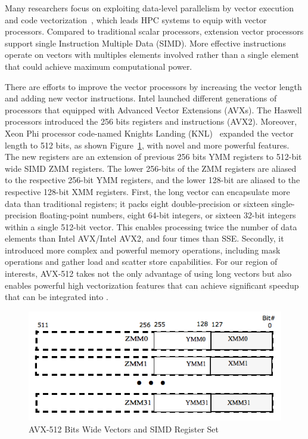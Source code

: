 \documentclass[conference]{IEEEtran}
\begin{document}
%
Many researchers focus on exploiting data-level parallelism by vector execution and code vectorization~\cite{Vectorizing-Compilers, VectorArchitectures}, which leads HPC
systems to equip with vector processors.
%
Compared to traditional scalar processors, extension vector processors support single Instruction Multiple Data (SIMD). More effective instructions operate on vectors with multiples elements involved rather than a single element that could achieve maximum computational power.
%

There are efforts to improve the vector processors by increasing the vector length and adding new vector instructions.
Intel launched different generations of processors that equipped with Advanced Vector Extensions (AVXs).
The Haswell processors introduced the 256 bits registers and instructions (AVX2).
Moreover, Xeon Phi processor code-named Knights Landing (KNL)~\cite{avx-info, Intelref} expanded
the vector length to 512 bits, as shown Figure~\ref{fig:avx_mms}, with novel and more powerful features.
The new registers are an extension of previous 256 bits YMM registers to 512-bit wide SIMD ZMM registers.
The lower 256-bits of the ZMM registers are aliased to the respective 256-bit YMM registers, and the lower 128-bit are
aliased to the respective 128-bit XMM registers.
First, the long vector can encapsulate more data than traditional registers; it packs eight double-precision or sixteen single-precision floating-point numbers, eight 64-bit integers, or sixteen 32-bit integers within a single 512-bit vector. This enables processing twice the number of data elements than Intel AVX/Intel AVX2, and four times than SSE.
Secondly, it introduced more complex and powerful memory operations,
including mask operations and gather load and scatter store capabilities.
For our region of interests, AVX-512 takes not the only advantage of using long vectors but also enables powerful high vectorization features that can achieve significant speedup that can be integrated into \ompi.

\begin{figure}[h]
    \centering
    \includegraphics[width=\linewidth]{avx_mms.png}
    \caption{AVX-512 Bits Wide Vectors and SIMD Register Set}
    \label{fig:avx_mms}
\end{figure}
\end{document}

